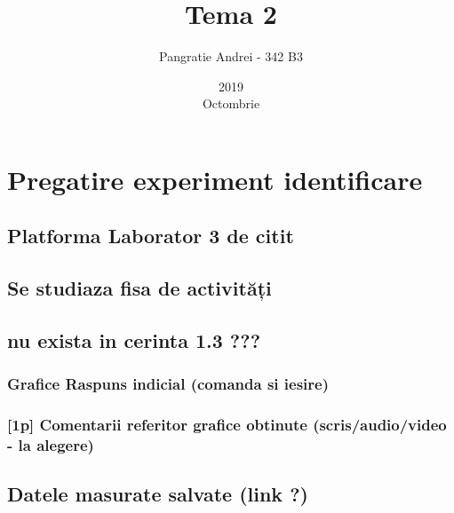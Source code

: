 \documentclass[12pt,english]{article}
\title{Tema 2}
\date{2019\\ Octombrie}
\author{Pangratie Andrei - 342 B3}
\begin{document}
\maketitle
\newpage

\tableofcontents
\newpage

\section { Pregatire experiment identificare }
\subsection { Platforma Laborator 3 de citit }
\subsection { Se studiaza fisa de activități }
\subsection { nu exista in cerinta 1.3 ??? }
\subsubsection { Grafice Raspuns indicial (comanda si iesire) }
\begin{center}
\end{center}

\subsubsection { [1p] Comentarii referitor grafice obtinute (scris/audio/video - la alegere) }
\subsection { Datele masurate salvate (link ?) }
\end{document}
